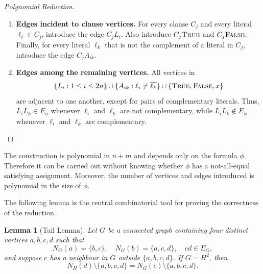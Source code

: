 \documentclass[11pt]{report}
\newtheorem{lemma}{Lemma}
\begin{document}
\begin{proof}[Polynomial Reduction]
\begin{enumerate}[label=\roman*)]
    \[
    C_j^3C_j^2,\quad C_j^3C_j^1,\quad C_j^2C_j^1,\quad C_j^2C_j,\quad C_j^1C_j, \quad C_j^1L_{j_1},\quad C_j^1L_{j_2},\quad C_j^1L_{j_3},
    \]
    where $C_j=\{\ell_{j_1},\ell_{j_2},\ell_{j_3}\}$.
    \item \textbf{Edges incident to clause vertices.} For every clause $C_j$ and every literal $\ell_i \in C_j$, introduce the edge $C_jL_i$. Also introduce $C_j\text{$\textsc{True}$}$ and $C_j\text{$\textsc{False}$}$. Finally, for every literal $\ell_k$ that is not the complement of a literal in $C_j$, introduce the edge $C_jA_{ik}$.
    \item \textbf{Edges among the remaining vertices.} All vertices in
    \[
    \{L_i:1\leq i\leq 2n\} \cup \{A_{ik}: \ell_i \neq \overline{\ell_k}\} \cup \{\text{$\textsc{True}$},\text{$\textsc{False}$},x\}
    \]
    are adjacent to one another, except for pairs of complementary literals. Thus, $L_iL_k\in E_\phi$ whenever $\ell_i$ and $\ell_k$ are not complementary, while $L_iL_k \notin E_\phi$ whenever $\ell_i$ and $\ell_k$ are complementary.
  \end{enumerate}
\end{proof}


The construction is polynomial in $n+m$ and depends only on the formula $\phi$. Therefore it can be carried out without knowing whether $\phi$ has a not-all-equal satisfying assignment. Moreover, the number of vertices and edges introduced is polynomial in the size of $\phi$.

The following lemma is the central combinatorial tool for proving the correctness of the reduction.

\begin{lemma}[Tail Lemma] \label{lemma::tail}
  Let $G$ be a connected graph containing four distinct vertices $a,b,c,d$ such that
  \[
  N_G(a)=\{b,c\},\quad N_G(b)=\{a,c,d\},\quad cd\in E_G,
  \]
  and suppose $c$ has a neighbour in $G$ outside $\{a,b,c,d\}$. If $G=H^2$, then
  \[
  N_H(d)\setminus\{a,b,c,d\} = N_G(c)\setminus\{a,b,c,d\}.
  \]
\end{lemma}

\end{document}
